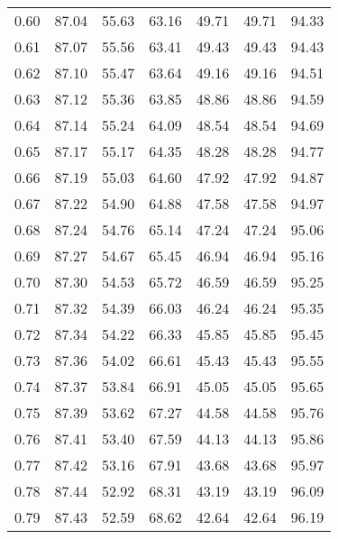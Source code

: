 \begin{tabular}{|c|c|c|c|c|c|c|}
      0.60 &     87.04 &     55.63 &      63.16 &   49.71 &      49.71 &         94.33 \\
      0.61 &     87.07 &     55.56 &      63.41 &   49.43 &      49.43 &         94.43 \\
      0.62 &     87.10 &     55.47 &      63.64 &   49.16 &      49.16 &         94.51 \\
      0.63 &     87.12 &     55.36 &      63.85 &   48.86 &      48.86 &         94.59 \\
      0.64 &     87.14 &     55.24 &      64.09 &   48.54 &      48.54 &         94.69 \\
      0.65 &     87.17 &     55.17 &      64.35 &   48.28 &      48.28 &         94.77 \\
      0.66 &     87.19 &     55.03 &      64.60 &   47.92 &      47.92 &         94.87 \\
      0.67 &     87.22 &     54.90 &      64.88 &   47.58 &      47.58 &         94.97 \\
      0.68 &     87.24 &     54.76 &      65.14 &   47.24 &      47.24 &         95.06 \\
      0.69 &     87.27 &     54.67 &      65.45 &   46.94 &      46.94 &         95.16 \\
      0.70 &     87.30 &     54.53 &      65.72 &   46.59 &      46.59 &         95.25 \\
      0.71 &     87.32 &     54.39 &      66.03 &   46.24 &      46.24 &         95.35 \\
      0.72 &     87.34 &     54.22 &      66.33 &   45.85 &      45.85 &         95.45 \\
      0.73 &     87.36 &     54.02 &      66.61 &   45.43 &      45.43 &         95.55 \\
      0.74 &     87.37 &     53.84 &      66.91 &   45.05 &      45.05 &         95.65 \\
      0.75 &     87.39 &     53.62 &      67.27 &   44.58 &      44.58 &         95.76 \\
      0.76 &     87.41 &     53.40 &      67.59 &   44.13 &      44.13 &         95.86 \\
      0.77 &     87.42 &     53.16 &      67.91 &   43.68 &      43.68 &         95.97 \\
      0.78 &     87.44 &     52.92 &      68.31 &   43.19 &      43.19 &         96.09 \\
      0.79 &     87.43 &     52.59 &      68.62 &   42.64 &      42.64 &         96.19 \\

\end{tabular}
